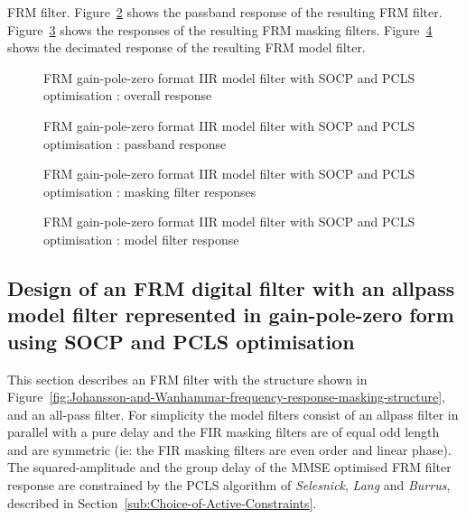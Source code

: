 \documentclass[a4paper,twoside,10pt,english]{report}
\begin{document}
FRM filter. Figure~\ref{fig:iir-frm-socp-pcls-passband-response} 
shows the passband response of the resulting FRM filter. 
Figure~\ref{fig:iir-frm-socp-pcls-mask-response} 
shows the responses of the resulting FRM masking filters. 
Figure~\ref{fig:iir-frm-socp-pcls-model-response} 
shows the decimated response of the resulting FRM model filter.
\begin{figure}[!htbp]
\begin{center}
\scalebox{0.7}{}
\caption{FRM gain-pole-zero format IIR model filter with SOCP and PCLS optimisation : overall response}
\label{fig:iir-frm-socp-pcls-response}
\end{center}
\end{figure}
\begin{figure}[!htbp]
\begin{center}
\scalebox{0.7}{}
\caption{FRM gain-pole-zero format IIR model filter with SOCP and PCLS optimisation : passband response}
\label{fig:iir-frm-socp-pcls-passband-response}
\end{center}
\end{figure}
\begin{figure}[!htbp]
\begin{center}
\scalebox{0.7}{}
\caption{FRM gain-pole-zero format IIR model filter with SOCP and PCLS optimisation : masking filter responses}
\label{fig:iir-frm-socp-pcls-mask-response}
\end{center}
\end{figure}
\begin{figure}[!htbp]
\begin{center}
\scalebox{0.7}{}
\caption{FRM gain-pole-zero format IIR model filter with SOCP and PCLS optimisation : model filter response}
\label{fig:iir-frm-socp-pcls-model-response}
\end{center}
\end{figure}
\clearpage
\subsection{\label{sec:FRM-filter-allpass-model-filter-gain-pole-zero-SOCP-PCLS}Design of  an FRM digital filter with an allpass model filter represented in gain-pole-zero form using SOCP and PCLS optimisation}
This section describes an FRM filter with the structure shown in
Figure~\ref{fig:Johansson-and-Wanhammar-frequency-response-masking-structure},
and an all-pass filter. For simplicity the model filters consist of an
allpass filter in parallel with a pure delay and the FIR masking filters are
of equal odd length and are symmetric (ie: the FIR masking filters are even
order and linear phase). The squared-amplitude and the group delay of the MMSE
optimised FRM filter response are constrained by the PCLS algorithm of
\emph{Selesnick}, \emph{Lang} and \emph{Burrus}, described in
Section~\ref{sub:Choice-of-Active-Constraints}.
\end{document}
